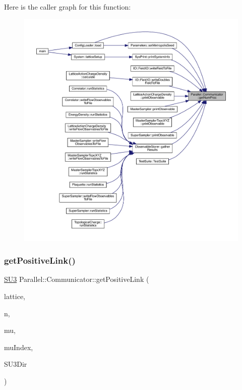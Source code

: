 Here is the caller graph for this function\+:\nopagebreak
\begin{figure}[H]
\begin{center}
\leavevmode
\includegraphics[width=350pt]{class_parallel_1_1_communicator_a7b1f80fb49a0cc83f2031c3415174150_icgraph}
\end{center}
\end{figure}
\mbox{\label{class_parallel_1_1_communicator_ae715d67d2e60def9bf529702a64f4caa}} 
\subsubsection{\texorpdfstring{getPositiveLink()}{getPositiveLink()}}
{\footnotesize\ttfamily \mbox{\hyperlink{class_s_u3}{S\+U3}} Parallel\+::\+Communicator\+::get\+Positive\+Link (\begin{DoxyParamCaption}\item[{\mbox{\hyperlink{class_lattice}{Lattice}}$<$ \mbox{\hyperlink{class_s_u3}{S\+U3}} $>$ $\ast$}]{lattice,  }\item[{std\+::vector$<$ int $>$}]{n,  }\item[{int}]{mu,  }\item[{int $\ast$}]{mu\+Index,  }\item[{int}]{S\+U3\+Dir }\end{DoxyParamCaption})\hspace{0.3cm}{\ttfamily [static]}}

